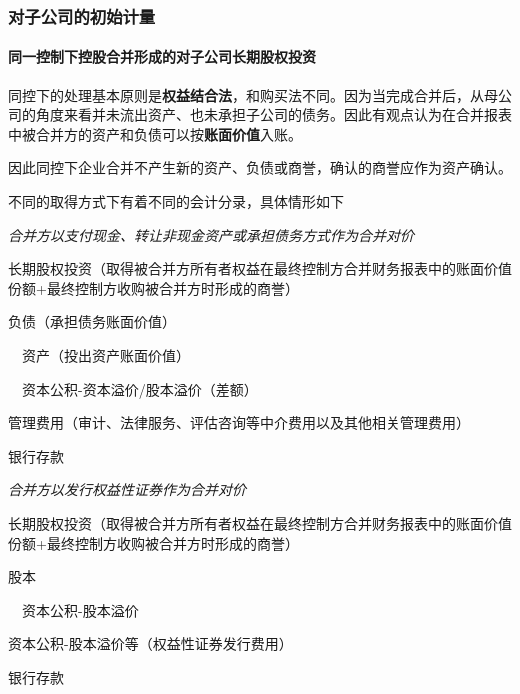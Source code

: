 \documentclass[UTF8,12pt]{ctexart}
\newenvironment{Dr}{%
	\begin{list}{}%
		{
			\setlength{\leftmargin}{2em}
			\setlength{\labelwidth}{2em}
			\setlength{\labelsep}{0pt}
			\setlength{\itemindent}{0pt}
			\setlength{\listparindent}{0pt}
			\setlength{\parsep}{0pt}
			\setlength{\topsep}{0pt}
		}
		\item[\textbf{借：}]
	}{%
	\end{list}
}
\newenvironment{Cr}{%
	\begin{list}{}%
		{
			\setlength{\leftmargin}{2em}
			\setlength{\labelwidth}{2em}
			\setlength{\labelsep}{0pt}
			\setlength{\itemindent}{0pt}
			\setlength{\listparindent}{0pt}
			\setlength{\parsep}{0pt}
			\setlength{\topsep}{0pt}
		}
		\item[\textbf{贷：}]
	}{%
	\end{list}
}
\numberwithin{equation}{section} %
\numberwithin{figure}{section}
\numberwithin{table}{section}
\begin{document}
	\subsubsection{对子公司的初始计量}
	\paragraph{同一控制下控股合并形成的对子公司长期股权投资}
	同控下的处理基本原则是\textbf{权益结合法}，和购买法不同。因为当完成合并后，从母公司的角度来看并未流出资产、也未承担子公司的债务。因此有观点认为在合并报表中被合并方的资产和负债可以按\textbf{账面价值}入账。
	
	因此同控下企业合并不产生新的资产、负债或商誉，确认的商誉应作为资产确认。
	
	不同的取得方式下有着不同的会计分录，具体情形如下
	
	\textit{合并方以支付现金、转让非现金资产或承担债务方式作为合并对价}
	
	\begin{Dr}
		长期股权投资（取得被合并方所有者权益在最终控制方合并财务报表中的账面价值份额+最终控制方收购被合并方时形成的商誉）
	\end{Dr}
	\begin{Cr}
		负债（承担债务账面价值）
		
		\ \ 资产（投出资产账面价值）
		
		\ \ 资本公积-资本溢价/股本溢价（差额）
	\end{Cr}
	
	\begin{Dr}
		管理费用（审计、法律服务、评估咨询等中介费用以及其他相关管理费用）
	\end{Dr}
	\begin{Cr}
		银行存款
	\end{Cr}
	
	\textit{合并方以发行权益性证券作为合并对价}
	
	\begin{Dr}
		长期股权投资（取得被合并方所有者权益在最终控制方合并财务报表中的账面价值份额+最终控制方收购被合并方时形成的商誉）
	\end{Dr}
	\begin{Cr}
		股本
		
		\ \ 资本公积-股本溢价
	\end{Cr}
	
	\begin{Dr}
		资本公积-股本溢价等（权益性证券发行费用）
	\end{Dr}
	\begin{Cr}
		银行存款
	\end{Cr}
	
\end{document}
